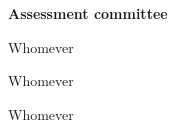 \begin{titlepage}
\begin{addmargin}[-1cm]{-3cm}
    \vspace{6mm}

    \textbf{Assessment committee}
    \begin{description}
        \item Whomever
        \item Whomever
        \item Whomever
    \end{description}

  \end{addmargin}

\end{titlepage}


    

